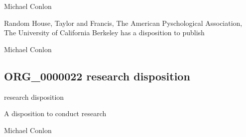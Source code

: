 \documentclass[letterpaper,10pt,english]{sphinxmanual}
\begin{document}
\begin{sphinxShadowBox}

\sphinxAtStartPar
Michael Conlon 
\end{sphinxShadowBox}

\begin{sphinxShadowBox}

\sphinxAtStartPar
Random House, Taylor and Francis, The American Pyschological Association, The University of California Berkeley has a disposition to publish
\end{sphinxShadowBox}

\begin{sphinxShadowBox}

\sphinxAtStartPar
Michael Conlon 
\end{sphinxShadowBox}
\begin{quote}

\ignorespaces \end{quote}


\subsection{ORG\_0000022 \sphinxhyphen{} research disposition}
\label{\detokenize{doc-ORG_0000022:org-0000022-research-disposition}}\label{\detokenize{doc-ORG_0000022:index-0}}\label{\detokenize{doc-ORG_0000022::doc}}
\begin{sphinxShadowBox}

\sphinxAtStartPar
research disposition
\end{sphinxShadowBox}

\begin{sphinxShadowBox}

\sphinxAtStartPar
A disposition to conduct research
\end{sphinxShadowBox}

\begin{sphinxShadowBox}

\sphinxAtStartPar
Michael Conlon 
\end{sphinxShadowBox}
\end{document}
